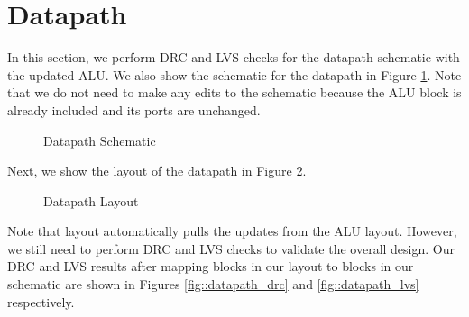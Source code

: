 \documentclass{article}
\begin{document}
	\section{Datapath}
	
	In this section, we perform DRC and LVS checks for the datapath schematic with the updated ALU. We also show the schematic for the datapath in Figure \ref{fig::datapath_schematic}. Note that we do not need to make any edits to the schematic because the ALU block is already included and its ports are unchanged.
	
	\begin{figure}[H]
		\centerline{}
		\caption{Datapath Schematic}
		\label{fig::datapath_schematic}
	\end{figure}
	
	\noindent Next, we show the layout of the datapath in Figure \ref{fig::datapath_layout}.
	
	\begin{figure}[H]
		\centerline{}
		\caption{Datapath Layout}
		\label{fig::datapath_layout}
	\end{figure}
	
	\noindent Note that layout automatically pulls the updates from the ALU layout. However, we still need to perform DRC and LVS checks to validate the overall design. Our DRC and LVS results after mapping blocks in our layout to blocks in our schematic are shown in Figures \ref{fig::datapath_drc} and \ref{fig::datapath_lvs} respectively.
	
\end{document}
